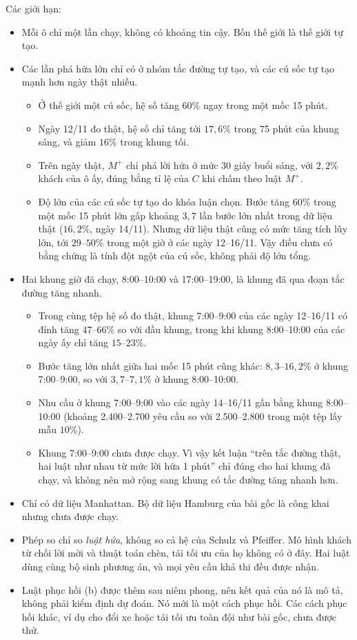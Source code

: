 Các giới hạn:
\begin{itemize}
\item Mỗi ô chỉ một lần chạy, không có khoảng tin cậy. Bốn thế giới là thế giới tự tạo.
\item Các lần phá hứa lớn chỉ có ở nhóm tắc đường tự tạo, và các cú sốc tự tạo mạnh hơn ngày thật
nhiều.
  \begin{itemize}
  \item Ở thế giới một cú sốc, hệ số tăng $60\%$ ngay trong một mốc 15 phút.
  \item Ngày 12/11 đo thật, hệ số chỉ tăng tới $17{,}6\%$ trong 75 phút của khung sáng, và giảm $16\%$
  trong khung tối.
  \item Trên ngày thật, $M^{+}$ chỉ phá lời hứa ở mức 30 giây buổi sáng, với $2{,}2\%$ khách của ô ấy,
  đúng bằng tỉ lệ của $C$ khi chấm theo luật $M^{+}$.
  \item Độ lớn của các cú sốc tự tạo do khóa luận chọn. Bước tăng $60\%$ trong một mốc 15 phút lớn gấp
  khoảng $3{,}7$ lần bước lớn nhất trong dữ liệu thật ($16{,}2\%$, ngày 14/11). Nhưng dữ liệu thật cũng
  có mức tăng tích lũy lớn, tới $29$--$50\%$ trong một giờ ở các ngày 12--16/11. Vậy điều chưa có bằng
  chứng là tính đột ngột của cú sốc, không phải độ lớn tổng.
  \end{itemize}
\item Hai khung giờ đã chạy, 8:00--10:00 và 17:00--19:00, là khung đã qua đoạn tắc đường tăng nhanh.
  \begin{itemize}
  \item Trong cùng tệp hệ số đo thật, khung 7:00--9:00 của các ngày 12--16/11 có đỉnh tăng
  $47$--$66\%$ so với đầu khung, trong khi khung 8:00--10:00 của các ngày ấy chỉ tăng $15$--$23\%$.
  \item Bước tăng lớn nhất giữa hai mốc 15 phút cũng khác: $8{,}3$--$16{,}2\%$ ở khung 7:00--9:00,
  so với $3{,}7$--$7{,}1\%$ ở khung 8:00--10:00.
  \item Nhu cầu ở khung 7:00--9:00 vào các ngày 14--16/11 gần bằng khung 8:00--10:00 (khoảng 2.400--2.700
  yêu cầu so với 2.500--2.800 trong một tệp lấy mẫu $10\%$).
  \item Khung 7:00--9:00 chưa được chạy. Vì vậy kết luận ``trên tắc đường thật, hai luật như nhau từ
  mức lời hứa 1 phút'' chỉ đúng cho hai khung đã chạy, và không nên mở rộng sang khung có tắc đường tăng nhanh
  hơn.
  \end{itemize}
\item Chỉ có dữ liệu Manhattan. Bộ dữ liệu Hamburg của bài gốc là công khai nhưng chưa được chạy.
\item Phép so chỉ so \emph{luật hứa}, không so cả hệ của Schulz và Pfeiffer. Mô hình khách từ chối lời mời
và thuật toán chèn, tái tối ưu của họ không có ở đây. Hai luật dùng cùng bộ sinh phương án, và mọi yêu
cầu khả thi đều được nhận.
\item Luật phục hồi (b) được thêm sau niêm phong, nên kết quả của nó là mô tả, không phải kiểm định dự
đoán. Nó mới là một cách phục hồi. Các cách phục hồi khác, ví dụ cho đổi xe hoặc tái tối ưu toàn đội như
bài gốc, chưa được thử.
\end{itemize}

